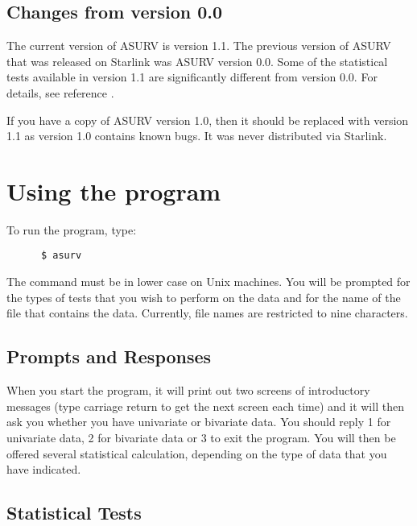 \subsection{Changes from version 0.0}

The current version of ASURV is version 1.1. The previous version of ASURV that
was released on Starlink was ASURV version 0.0. Some of the statistical tests
available in version 1.1 are significantly different from version 0.0. For
details, see reference \cite{mud-1}.

If you have a copy of ASURV version 1.0, then it should be replaced with
version 1.1 as version 1.0 contains known bugs. It was never distributed via
Starlink.

\section {Using the program} 

To run the program, type:                                         

\begin{verbatim} 
      $ asurv
\end{verbatim} 

The command must be in lower case on Unix machines. You will be prompted for
the types of tests that you wish to perform on the data and for the name of the
file that contains the data. Currently, file names are restricted to nine
characters.

\subsection {Prompts and Responses}

When you start the program, it will print out two screens of introductory
messages (type carriage return to get the next screen each time) and it will
then ask you whether you have univariate or bivariate data. You should reply 1
for univariate data, 2 for bivariate data or 3 to exit the program. You will
then be offered several statistical calculation, depending on the type of data
that you have indicated.

\subsection {Statistical Tests}


